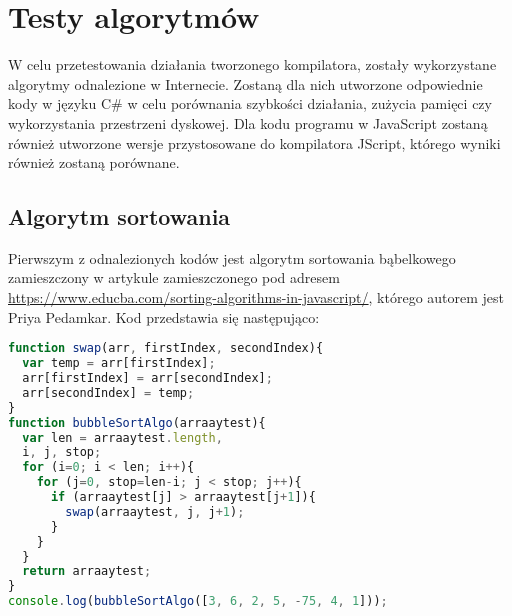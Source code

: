 
\section{Testy algorytmów}

\par W celu przetestowania działania tworzonego kompilatora, zostały wykorzystane algorytmy odnalezione w Internecie. Zostaną dla nich utworzone odpowiednie kody w języku C\# w celu porównania szybkości działania, zużycia pamięci czy wykorzystania przestrzeni dyskowej. Dla kodu programu w JavaScript zostaną również utworzone wersje przystosowane do kompilatora JScript, którego wyniki również zostaną porównane.

\subsection{Algorytm sortowania}
\par Pierwszym z odnalezionych kodów jest algorytm sortowania bąbelkowego zamieszczony w artykule zamieszczonego pod adresem \url{https://www.educba.com/sorting-algorithms-in-javascript/}, którego autorem jest Priya Pedamkar. Kod przedstawia się następująco:

\begin{lstlisting}[language=JavaScript, caption={Algorytm sortowania bąbelkowego. Źródło: \url{https://www.educba.com/sorting-algorithms-in-javascript/}}, label=alg:alg1]
function swap(arr, firstIndex, secondIndex){
  var temp = arr[firstIndex];
  arr[firstIndex] = arr[secondIndex];
  arr[secondIndex] = temp;
}
function bubbleSortAlgo(arraaytest){
  var len = arraaytest.length,
  i, j, stop;
  for (i=0; i < len; i++){
    for (j=0, stop=len-i; j < stop; j++){
      if (arraaytest[j] > arraaytest[j+1]){
        swap(arraaytest, j, j+1);
      }
    }
  }
  return arraaytest;
}
console.log(bubbleSortAlgo([3, 6, 2, 5, -75, 4, 1]));
\end{lstlisting}

